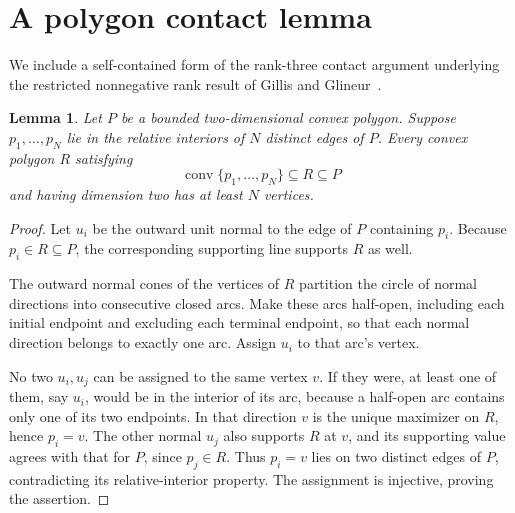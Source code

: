 \documentclass[11pt]{article}
\newtheorem{lemma}[theorem]{Lemma}
\newcommand{\conv}{\operatorname{conv}}
\begin{document}
\section{A polygon contact lemma}
We include a self-contained form of the rank-three contact argument underlying the restricted nonnegative rank result of Gillis and Glineur~\cite[Theorem 8]{gg}.
\begin{lemma}\label{lem:contact}
Let $P$ be a bounded two-dimensional convex polygon. Suppose $p_1,\ldots,p_N$ lie in the relative interiors of $N$ distinct edges of $P$. Every convex polygon $R$ satisfying
\[
 \conv\{p_1,\ldots,p_N\}\subseteq R\subseteq P
\]
and having dimension two has at least $N$ vertices.
\end{lemma}
\begin{proof}
Let $u_i$ be the outward unit normal to the edge of $P$ containing $p_i$. Because $p_i\in R\subseteq P$, the corresponding supporting line supports $R$ as well.

The outward normal cones of the vertices of $R$ partition the circle of normal directions into consecutive closed arcs. Make these arcs half-open, including each initial endpoint and excluding each terminal endpoint, so that each normal direction belongs to exactly one arc. Assign $u_i$ to that arc's vertex.

No two $u_i,u_j$ can be assigned to the same vertex $v$. If they were, at least one of them, say $u_i$, would be in the interior of its arc, because a half-open arc contains only one of its two endpoints. In that direction $v$ is the unique maximizer on $R$, hence $p_i=v$. The other normal $u_j$ also supports $R$ at $v$, and its supporting value agrees with that for $P$, since $p_j\in R$. Thus $p_i=v$ lies on two distinct edges of $P$, contradicting its relative-interior property. The assignment is injective, proving the assertion.
\end{proof}
\end{document}
